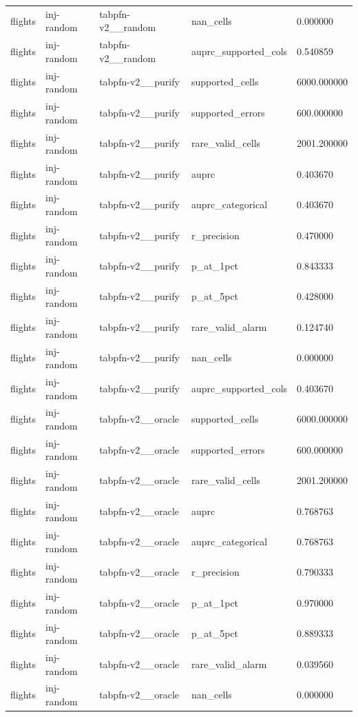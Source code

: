 \begin{tabular}{lllll}
flights & inj-random & tabpfn-v2\_\_random & nan\_cells & 0.000000 \\
flights & inj-random & tabpfn-v2\_\_random & auprc\_supported\_cols & 0.540859 \\
flights & inj-random & tabpfn-v2\_\_purify & supported\_cells & 6000.000000 \\
flights & inj-random & tabpfn-v2\_\_purify & supported\_errors & 600.000000 \\
flights & inj-random & tabpfn-v2\_\_purify & rare\_valid\_cells & 2001.200000 \\
flights & inj-random & tabpfn-v2\_\_purify & auprc & 0.403670 \\
flights & inj-random & tabpfn-v2\_\_purify & auprc\_categorical & 0.403670 \\
flights & inj-random & tabpfn-v2\_\_purify & r\_precision & 0.470000 \\
flights & inj-random & tabpfn-v2\_\_purify & p\_at\_1pct & 0.843333 \\
flights & inj-random & tabpfn-v2\_\_purify & p\_at\_5pct & 0.428000 \\
flights & inj-random & tabpfn-v2\_\_purify & rare\_valid\_alarm & 0.124740 \\
flights & inj-random & tabpfn-v2\_\_purify & nan\_cells & 0.000000 \\
flights & inj-random & tabpfn-v2\_\_purify & auprc\_supported\_cols & 0.403670 \\
flights & inj-random & tabpfn-v2\_\_oracle & supported\_cells & 6000.000000 \\
flights & inj-random & tabpfn-v2\_\_oracle & supported\_errors & 600.000000 \\
flights & inj-random & tabpfn-v2\_\_oracle & rare\_valid\_cells & 2001.200000 \\
flights & inj-random & tabpfn-v2\_\_oracle & auprc & 0.768763 \\
flights & inj-random & tabpfn-v2\_\_oracle & auprc\_categorical & 0.768763 \\
flights & inj-random & tabpfn-v2\_\_oracle & r\_precision & 0.790333 \\
flights & inj-random & tabpfn-v2\_\_oracle & p\_at\_1pct & 0.970000 \\
flights & inj-random & tabpfn-v2\_\_oracle & p\_at\_5pct & 0.889333 \\
flights & inj-random & tabpfn-v2\_\_oracle & rare\_valid\_alarm & 0.039560 \\
flights & inj-random & tabpfn-v2\_\_oracle & nan\_cells & 0.000000 \\

\end{tabular}
